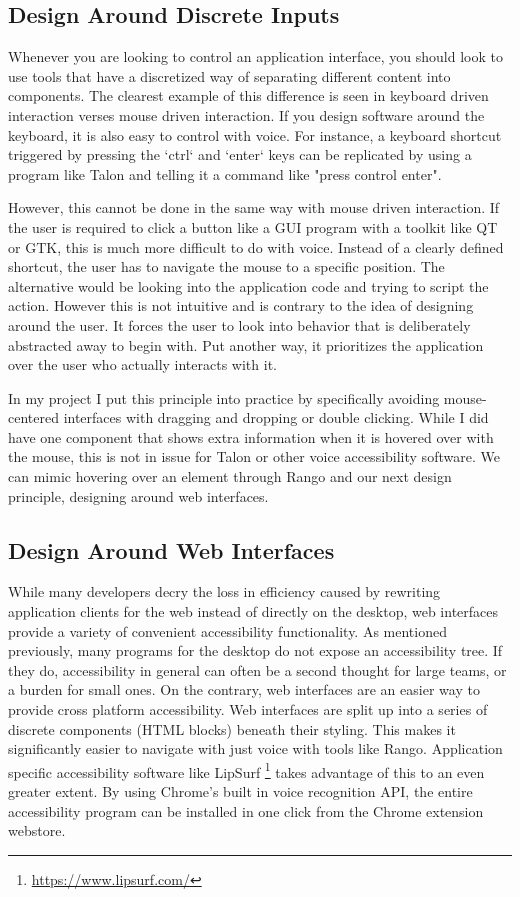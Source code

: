 \documentclass[manuscript,screen,review]{acmart}
\begin{document}
{\subsection*{ Design Around Discrete Inputs}

Whenever you are looking to control an application interface, you should look to use tools that have a discretized way of separating different content into components. The clearest example of this difference is seen in keyboard driven interaction verses mouse driven interaction. If you design software around the keyboard, it is also easy to control with voice. For instance, a keyboard shortcut triggered by pressing the `ctrl` and `enter` keys can be replicated by using a program like Talon and telling it a command like "press control enter".

However, this cannot be done in the same way with mouse driven interaction. If the user is required to click a button like a GUI program with a toolkit like QT or GTK, this is much more difficult to do with voice. Instead of a clearly defined shortcut, the user has to navigate the mouse to a specific position. The alternative would be looking into the application code and trying to script the action. However this is not intuitive and is contrary to the idea of designing around the user. It forces the user to look into behavior that is deliberately abstracted away to begin with. Put another way, it prioritizes the application over the user who actually interacts with it.

In my project I put this principle into practice by specifically avoiding mouse-centered interfaces with dragging and dropping or double clicking. While I did have one component that shows extra information when it is hovered over with the mouse, this is not in issue for Talon or other voice accessibility software. We can mimic hovering over an element through Rango and our next design principle, designing around web interfaces.

\subsection*{Design Around Web Interfaces}

While many developers decry the loss in efficiency caused by rewriting application clients for the web instead of directly on the desktop, web interfaces provide a variety of convenient accessibility functionality. As mentioned previously, many programs for the desktop do not expose an accessibility tree. If they do, accessibility in general can often be a second thought for large teams, or a burden for small ones. On the contrary, web interfaces are an easier way to provide cross platform accessibility. Web interfaces are split up into a series of discrete components (HTML blocks) beneath their styling. This makes it significantly easier to navigate with just voice with tools like Rango. Application specific accessibility software like LipSurf \footnote{\url{https://www.lipsurf.com/}} takes advantage of this to an even greater extent. By using Chrome's built in voice recognition API, the entire accessibility program can be installed in one click from the Chrome extension webstore.

}
\end{document}
